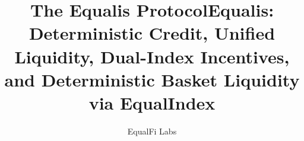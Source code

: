 \documentclass[version=preprint]{iacrcc}
\title[running = {Equalis},
       subtitle = {}]
      {The Equalis Protocol}
\begin{document}
\maketitle        %

\clearpage             %
\setcounter{page}{1}   %

\title{Equalis: Deterministic Credit, Unified Liquidity, Dual-Index Incentives, and Deterministic Basket Liquidity via EqualIndex}
\author{EqualFi Labs}

\maketitle
\end{document}
